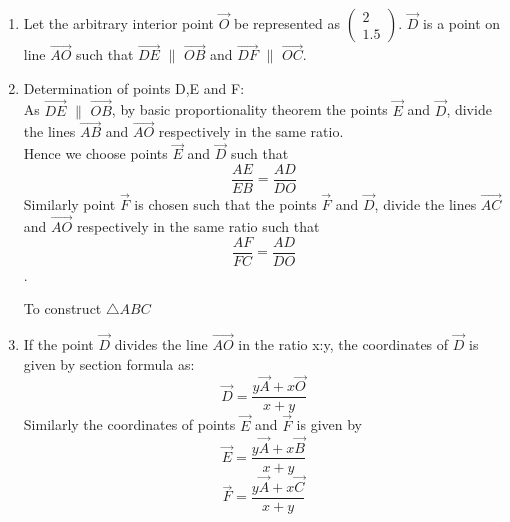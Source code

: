 \begin{enumerate}
\item   Let the arbitrary interior point $\vec{O}$ be represented as $\begin{pmatrix}2\\1.5\end{pmatrix}$.    
    $\vec{D}$ is a point on line $\vec{AO}$ such that $\vec{DE}$ $\parallel$ $\vec{OB}$ \quad and \quad $\vec{DF}$  $\parallel$  $\vec{OC}$.\\
\item Determination of points D,E and F:\\
As $\vec{DE}$ $\parallel$ $\vec{OB}$, by basic proportionality theorem the points $\vec{E}$ and $\vec{D}$, divide the lines $\vec{AB}$ and $\vec{AO}$ respectively in the same ratio.\\ Hence we choose points $\vec{E}$ and $\vec{D}$ such that \begin{equation}\frac{AE}{EB} = \frac{AD}{DO}\end{equation} \quad Similarly point $\vec{F}$ is chosen such that the points $\vec{F}$ and $\vec{D}$, divide the lines $\vec{AC}$ and $\vec{AO}$ respectively in the same ratio such that \begin{equation}\frac{AF}{FC} = \frac{AD}{DO}\end{equation}.\\
  
  
  \begin{table}[ht]
    \begin{center}
    	
  \caption{To construct $\triangle ABC$}
   \label{table:table2}
   \end{center}	
\end{table}


\item If the point $\vec{D}$ divides the line $\vec{AO}$ in the ratio x:y, the coordinates of $\vec{D}$ is given by section formula as:
\begin{equation} \vec{D} = \frac{y\vec{A} + x\vec{O}}{x+y}\end{equation}
Similarly the coordinates of points $\vec{E}$ and $\vec{F}$ is given by
\begin{equation} \vec{E} = \frac{y\vec{A} + x\vec{B}}{x+y}\end{equation}
\begin{equation} \vec{F} = \frac{y\vec{A} + x\vec{C}}{x+y}\end{equation}


\end{enumerate}
